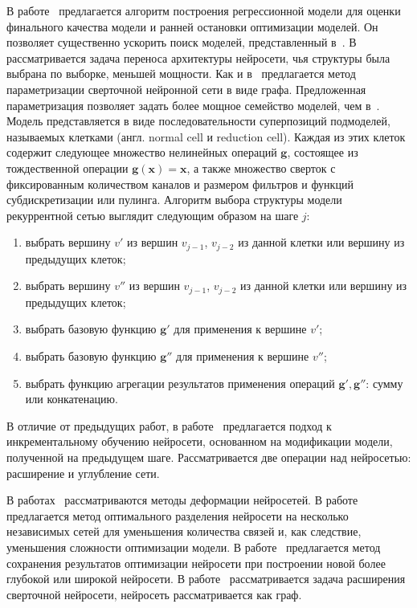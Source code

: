 В работе~\cite{reinf_predict} предлагается алгоритм построения регрессионной модели для оценки финального качества модели и ранней остановки оптимизации моделей. Он позволяет существенно ускорить поиск моделей, представленный в~\cite{reinf}.
В~\cite{reinf_transfer} рассматривается задача переноса архитектуры нейросети, чья структуры была выбрана по выборке, меньшей мощности. Как и в~\cite{reinf} предлагается метод параметризации сверточной нейронной сети в виде графа. Предложенная параметризация позволяет задать более мощное семейство моделей, чем в~\cite{reinf}. Модель представляется в виде последовательности суперпозиций подмоделей, называемых клетками (англ. normal cell и reduction cell). Каждая из этих клеток содержит следующее множество нелинейных операций $\mathbf{g}$, состоящее из тождественной операции $\mathbf{g}(\mathbf{x}) = \mathbf{x}$, а также множество сверток с фиксированным количеством каналов и размером фильтров и функций субдискретизации или пулинга.
Алгоритм выбора структуры модели рекуррентной сетью выглядит следующим образом на шаге $j$:
\begin{enumerate}[1)]
\item выбрать вершину $v'$ из вершин $v_{j-1}$, $v_{j-2}$ из данной клетки или вершину из предыдущих клеток;
\item выбрать вершину $v''$ из вершин $v_{j-1}$, $v_{j-2}$ из данной клетки или вершину из предыдущих клеток;
\item выбрать базовую функцию $\mathbf{g}'$ для применения к вершине $v'$;
\item выбрать базовую функцию $\mathbf{g}''$ для применения к вершине $v''$;
\item выбрать функцию агрегации результатов применения операций $\mathbf{g}',\mathbf{g}''$: сумму или конкатенацию.
\end{enumerate}


В отличие от предыдущих работ, в работе~\cite{reinf_deep2net} предлагается подход к инкрементальному обучению нейросети, основанном на модификации модели, полученной на предыдущем шаге. Рассматривается две операции над нейросетью: расширение и углубление сети.

В работах~\cite{net2net, morph, partition} рассматриваются методы деформации нейросетей. 
В работе~\cite{partition} предлагается метод оптимального разделения нейросети на несколько независимых сетей для уменьшения количества связей и, как следствие, уменьшения сложности оптимизации модели. В работе~\cite{net2net} предлагается метод сохранения результатов оптимизации нейросети при построении новой более глубокой или широкой нейросети. 
В работе~\cite{morph} рассматривается задача расширения сверточной нейросети, нейросеть рассматривается как граф.

